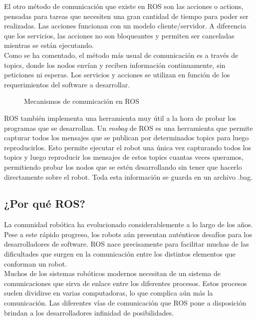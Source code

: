 El otro método de comunicación que existe en ROS son las acciones o actions, pensadas para tareas que necesiten una gran cantidad de tiempo para poder ser realizadas. Las acciones funcionan con un modelo cliente/servidor. A diferencia que los servicios, las acciones no son bloqueantes y permiten ser canceladas mientras se están ejecutando.\\

Como se ha comentado, el método más usual de comunicación es a través de topics, donde los nodos envían y reciben información continuamente, sin peticiones ni esperas. Los servicios y acciones se utilizan en función de los requerimientos del software a desarrollar.\\

\begin{figure}[H]
 \centering
  \hspace{0.5cm}
 \caption{Mecanismos de comunicación en ROS}
 \label{fig:comm}
\end{figure}

ROS también implementa una herramienta muy útil a la hora de probar los programas que se desarrollan. Un \textit{rosbag} de ROS es una herramienta que permite capturar todos los mensajes que se publican por determinados topics para luego reproducirlos. Esto permite ejecutar el robot una única vez capturando todos los topics y luego reproducir los mensajes de estos topics cuantas veces queramos, permitiendo probar los nodos que se estén desarrollando sin tener que hacerlo directamente sobre el robot. Toda esta información se guarda en un archivo .bag.\\

\subsection{¿Por qué ROS?}

La comunidad robótica ha evolucionado considerablemente a lo largo de los años. Pese a  este rápido progreso, los robots aún presentan auténticos desafíos para los desarrolladores de software. ROS nace precisamente para facilitar muchas de las dificultades que surgen en la comunicación entre los distintos elementos que conforman un robot.\\

Muchos de los sistemas robóticos modernos necesitan de un sistema de comunicaciones que sirva de enlace entre los diferentes procesos. Estos procesos suelen dividirse en varias computadoras, lo que complica aún más la comunicación. Las diferentes vías de comunicación que ROS pone a disposición brindan a los desarrolladores infinidad de posibilidades.\\

